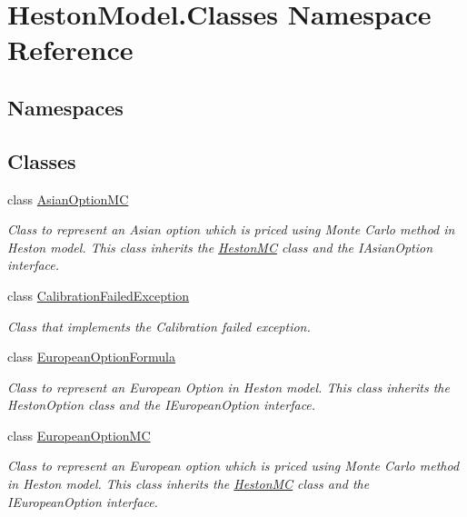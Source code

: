 \hypertarget{namespace_heston_model_1_1_classes}{}\section{Heston\+Model.\+Classes Namespace Reference}
\label{namespace_heston_model_1_1_classes}
\subsection*{Namespaces}
\begin{DoxyCompactItemize}
\end{DoxyCompactItemize}
\subsection*{Classes}
\begin{DoxyCompactItemize}
\item 
class \mbox{\hyperlink{class_heston_model_1_1_classes_1_1_asian_option_m_c}{Asian\+Option\+MC}}
\begin{DoxyCompactList}\small\item\em Class to represent an Asian option which is priced using Monte Carlo method in Heston model. This class inherits the \mbox{\hyperlink{class_heston_model_1_1_classes_1_1_heston_m_c}{Heston\+MC}} class and the I\+Asian\+Option interface. \end{DoxyCompactList}\item 
class \mbox{\hyperlink{class_heston_model_1_1_classes_1_1_calibration_failed_exception}{Calibration\+Failed\+Exception}}
\begin{DoxyCompactList}\small\item\em Class that implements the Calibration failed exception. \end{DoxyCompactList}\item 
class \mbox{\hyperlink{class_heston_model_1_1_classes_1_1_european_option_formula}{European\+Option\+Formula}}
\begin{DoxyCompactList}\small\item\em Class to represent an European Option in Heston model. This class inherits the Heston\+Option class and the I\+European\+Option interface. \end{DoxyCompactList}\item 
class \mbox{\hyperlink{class_heston_model_1_1_classes_1_1_european_option_m_c}{European\+Option\+MC}}
\begin{DoxyCompactList}\small\item\em Class to represent an European option which is priced using Monte Carlo method in Heston model. This class inherits the \mbox{\hyperlink{class_heston_model_1_1_classes_1_1_heston_m_c}{Heston\+MC}} class and the I\+European\+Option interface. \end{DoxyCompactList}\item 

\end{DoxyCompactItemize}
